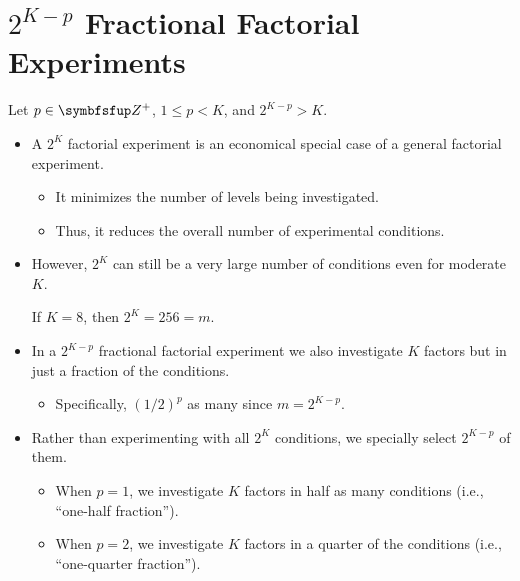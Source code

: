 \chapter{\texorpdfstring{$ 2^{K-p} $}{2K-p} Fractional Factorial Experiments}
Let $ p\in\Field{Z}^+ $, $ 1\le p<K $, and $ 2^{K-p}>K $.
\begin{itemize}[*]
    \item A $ 2^K $ factorial experiment is an economical special case of a general factorial experiment.
          \begin{itemize}[$\rightarrow$]
              \item It minimizes the number of levels being investigated.
              \item Thus, it reduces the overall number of experimental conditions.
          \end{itemize}
\end{itemize}
\begin{itemize}
    \item However, $ 2^K $ can still be a very large number of conditions even for moderate $ K $.
          \begin{Example}{}{}
              If $ K=8 $, then $ 2^K=256=m $.
          \end{Example}
\end{itemize}
\begin{itemize}[*]
    \item In a $ 2^{K-p} $ fractional factorial experiment we also investigate $ K $ factors but in just a fraction of the
          conditions.
          \begin{itemize}[label={}]
              \item Specifically, $ (1/2)^p $ as many since $ m=2^{K-p} $.
          \end{itemize}
\end{itemize}
\begin{itemize}[$\rightarrow$]
    \item Rather than experimenting with all $ 2^K $ conditions, we specially select $ 2^{K-p} $ of them.
          \begin{itemize}
              \item When $ p=1 $, we investigate $ K $ factors in half as many conditions (i.e., ``one-half fraction'').
              \item When $ p=2 $, we investigate $ K $ factors in a quarter of the conditions (i.e., ``one-quarter fraction'').
          \end{itemize}
\end{itemize}
